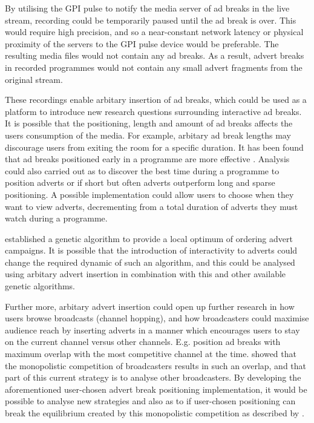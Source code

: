 	By utilising the GPI pulse to notify the media server of ad breaks in the live stream, recording could be temporarily paused until the ad break is over. This would require high precision, and so a near-constant network latency or physical proximity of the servers to the GPI pulse device would be preferable. The resulting media files would not contain any ad breaks. As a result, advert breaks in recorded programmes would not contain any small advert fragments from the original stream.

	These recordings enable arbitary insertion of ad breaks, which could be used as a platform to introduce new research questions surrounding interactive ad breaks. It is possible that the positioning, length and amount of ad breaks affects the users consumption of the media. For example, arbitary ad break lengths may discourage users from exiting the room for a specific duration. It has been found that ad breaks positioned early in a programme are more effective \citep{jeong2011position}. Analysis could also carried out as to discover the best time during a programme to position adverts or if short but often adverts outperform long and sparse positioning. A possible implementation could allow users to choose when they want to view adverts, decrementing from a total duration of adverts they must watch during a programme.

	\citet{fleming2007optimal} established a genetic algorithm to provide a local optimum of ordering advert campaigns. It is possible that the introduction of interactivity to adverts could change the required dynamic of such an algorithm, and this could be analysed using arbitary advert insertion in combination with this and other available genetic algorithms.

	Further more, arbitary advert insertion could open up further research in how users browse broadcasts (channel hopping), and how broadcasters could maximise audience reach by inserting adverts in a manner which encourages users to stay on the current channel versus other channels. E.g. position ad breaks with maximum overlap with the most competitive channel at the time. \citet{epstein1998network} showed that the monopolistic competition of broadcasters results in such an overlap, and that part of this current strategy is to analyse other broadcasters. By developing the aforementioned user-chosen advert break positioning implementation, it would be possible to analyse new strategies and also as to if user-chosen positioning can break the equilibrium created by this monopolistic competition as described by \citeauthor{epstein1998network}.


